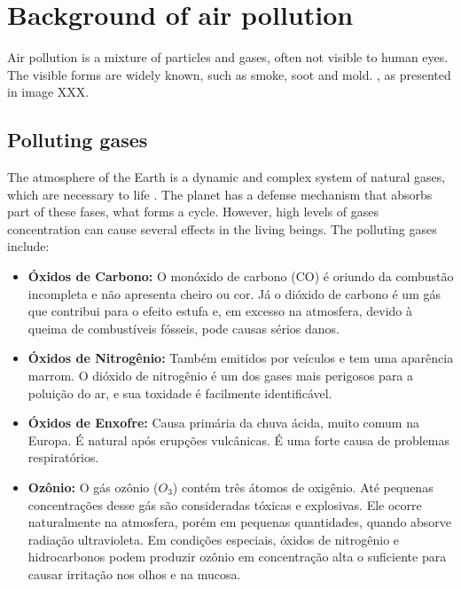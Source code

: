 \section{Background of air pollution}

Air pollution is a mixture of particles and gases, often not visible to human
eyes. The visible forms are widely known, such as smoke, soot and mold.
, as presented in image XXX.  

\subsection{Polluting gases}

The atmosphere of the Earth is a dynamic and complex system of natural gases,
which are necessary to life \cite{gases}. The planet has a
defense mechanism that absorbs part of these fases, what forms a cycle.
However, high levels of gases concentration can cause several effects in the
living beings. The polluting gases include: 

\begin{itemize}
    \item \textbf{Óxidos de Carbono:} O monóxido de carbono (CO) é oriundo da
    combustão incompleta e não apresenta cheiro ou cor. Já o dióxido de
    carbono é um gás que contribui para o efeito estufa e, em excesso na
    atmosfera, devido à queima de combustíveis fósseis, pode causas sérios
    danos.  
    \item \textbf{Óxidos de Nitrogênio:} Também emitidos por veículos e
    tem uma aparência marrom. O dióxido de nitrogênio é um dos gases mais
    perigosos para a poluição do ar, e sua toxidade é facilmente
    identificável. 
    \item \textbf{Óxidos de Enxofre:} Causa primária da chuva ácida, muito
    comum na Europa. É natural após erupções vulcânicas. É uma forte causa de
    problemas respiratórios. 
    \item \textbf{Ozônio:} O gás ozônio ($O_3$) contém três átomos de oxigênio. Até pequenas
    concentrações desse gás são consideradas tóxicas e explosivas. Ele ocorre
    naturalmente na atmosfera, porém em pequenas quantidades, quando absorve
    radiação ultravioleta. Em condições especiais, óxidos de nitrogênio e
    hidrocarbonos podem produzir ozônio em concentração alta o suficiente para
    causar irritação nos olhos e na mucosa. 
\end{itemize}


